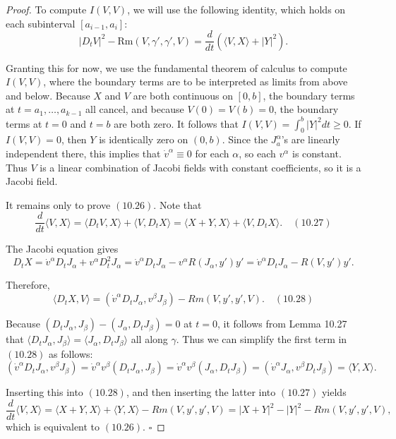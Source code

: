 \begin{proof}
To compute $I(V, V)$, we will use the following identity, which holds on each subinterval $[a_{i-1}, a_i]$:
\begin{equation}
|D_t V|^2 - \mathrm{Rm}(V, \gamma', \gamma', V) = \frac{d}{dt}(\langle V, X \rangle + |Y|^2). \tag{10.26}
\end{equation}

Granting this for now, we use the fundamental theorem of calculus to compute $I(V,V)$, where the boundary terms are to be interpreted as limits from above and below. Because $X$ and $V$ are both continuous on $[0,b]$, the boundary terms at $t=a_1, \ldots, a_{k-1}$ all cancel, and because $V(0) = V(b) = 0$, the boundary terms at $t = 0$ and $t = b$ are both zero. It follows that $I(V,V) = \int_0^b |Y|^2 dt \geq 0$. If $I(V,V) = 0$, then $Y$ is identically zero on $(0,b)$. Since the $J_a^{\alpha}$'s are linearly independent there, this implies that $\dot{v}^{\alpha} \equiv 0$ for each $\alpha$, so each $v^{\alpha}$ is constant. Thus $V$ is a linear combination of Jacobi fields with constant coefficients, so it is a Jacobi field.

It remains only to prove $(10.26)$. Note that
\[
\frac{d}{dt}\langle V,X \rangle = \langle D_tV,X \rangle + \langle V, D_tX \rangle = \langle X+Y, X \rangle + \langle V, D_tX \rangle. \quad (10.27)
\]

The Jacobi equation gives
\[
D_tX = \dot{v}^{\alpha} D_t J_{\alpha} + v^{\alpha} D_t^2 J_{\alpha} = \dot{v}^{\alpha} D_t J_{\alpha} - v^{\alpha} R(J_{\alpha}, y')y' = \dot{v}^{\alpha} D_t J_{\alpha} - R(V, y')y'.
\]

Therefore,
\[
\langle D_tX, V \rangle = (\dot{v}^{\alpha} D_t J_{\alpha}, v^{\beta} J_{\beta}) - Rm(V, y', y', V). \quad (10.28)
\]

Because $(D_t J_{\alpha}, J_{\beta}) - (J_{\alpha}, D_t J_{\beta}) = 0$ at $t=0$, it follows from Lemma 10.27 that $\langle D_t J_{\alpha}, J_{\beta} \rangle = \langle J_{\alpha}, D_t J_{\beta} \rangle$ all along $\gamma$. Thus we can simplify the first term in $(10.28)$ as follows:
\[
(\dot{v}^{\alpha} D_t J_{\alpha}, v^{\beta} J_{\beta}) = \dot{v}^{\alpha} v^{\beta} (D_t J_{\alpha}, J_{\beta}) = \dot{v}^{\alpha} v^{\beta} (J_{\alpha}, D_t J_{\beta})
= (\dot{v}^{\alpha} J_{\alpha}, v^{\beta} D_t J_{\beta}) = \langle Y, X \rangle.
\]

Inserting this into $(10.28)$, and then inserting the latter into $(10.27)$ yields
\[
\frac{d}{dt}\langle V,X \rangle = \langle X+Y, X \rangle + \langle Y, X \rangle - Rm(V, y', y', V)
= |X+Y|^2 - |Y|^2 - Rm(V, y', y', V),
\]
which is equivalent to $(10.26)$. \quad $\square$
\end{proof}


